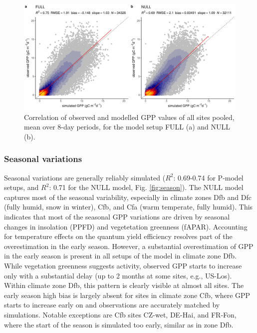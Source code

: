 \documentclass[gmd, manuscript]{copernicus}
\newcommand{\rsq}{$R^2$}
\begin{document}
\begin{figure}[t]
    \includegraphics[width=12cm]{fig/modobs_xdaily.pdf}
    \caption{Correlation of observed and modelled GPP values of all sites pooled, mean over 8-day periods, for the model setup FULL (a) and NULL (b).}
    \label{fig:modobs_xdaily}
\end{figure}

\subsubsection{Seasonal variations}
\label{sec:results_seasonal}
Seasonal variations are generally reliably simulated (\rsq : 0.69-0.74 for P-model setups, and \rsq : 0.71 for the NULL model, Fig. \ref{fig:season}). The NULL model captures most of the seasonal variability, especially in climate zones Dfb and Dfc (fully humid, snow in winter), Cfb, and Cfa (warm temperate, fully humid). This indicates that most of the  seasonal GPP variations are driven by seasonal changes in insolation (PPFD) and vegetetation greenness (fAPAR). Accounting for temperature effects on the quantum yield efficiency resolves part of the overestimation in the early season. However, a substantial overestimation of GPP in the early season is present in all setups of the model in climate zone Dfb. While vegetation greenness suggests activity, observed GPP starts to increase only with a substantial delay (up to 2 months at some sites, e.g., US-Los). Within climate zone Dfb, this pattern is clearly visible at almost all sites. The early season high bias is largely absent for sites in climate zone Cfb, where GPP starts to increase early on and observations are accurately matched by simulations. Notable exceptions are Cfb sites CZ-wet, DE-Hai, and FR-Fon, where the start of the season is simulated too early, similar as in zone Dfb.
\end{document}
